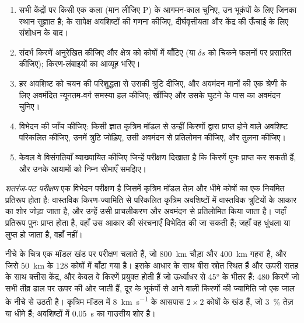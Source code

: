 \begin{method}[एक यात्रा-काल टोमोग्राफ़ी]\label{met:b3:seismology-imaging:tomo}
\begin{enumerate}
  \item सभी केंद्रों पर किसी एक कला (मान लीजिए P) के आगमन-काल चुनिए, उन भूकंपों के
        लिए जिनका स्थान सुज्ञात है;
         के सापेक्ष अवशिष्टों की गणना कीजिए,
        दीर्घवृत्तीयता और केंद्र की ऊँचाई के लिए संशोधन के बाद।
  \item संदर्भ किरणें अनुरेखित कीजिए और क्षेत्र को कोषों में बाँटिए (या $\delta s$ को
        चिकने फलनों पर प्रसारित कीजिए); किरण-लंबाइयों का आव्यूह भरिए।
  \item हर अवशिष्ट को चयन की परिशुद्धता से उसकी त्रुटि दीजिए, और अवमंदन मानों की एक
        श्रेणी के लिए अवमंदित न्यूनतम-वर्ग समस्या हल कीजिए;  खींचिए और
        उसके घुटने के पास का अवमंदन चुनिए।
  \item विभेदन की जाँच कीजिए: किसी ज्ञात कृत्रिम मॉडल से उन्हीं किरणों द्वारा प्राप्त
        होने वाले अवशिष्ट परिकलित कीजिए, उनमें त्रुटि जोड़िए, उसी अवमंदन से प्रतिलोमन
        कीजिए, और तुलना कीजिए।
  \item केवल वे विसंगतियाँ व्याख्यायित कीजिए जिन्हें परीक्षण दिखाता है कि किरणें
        पुनः प्राप्त कर सकती हैं, और उनके आयामों को निम्न सीमाएँ समझिए।
\end{enumerate}
\end{method}

\begin{definition}[शतरंज-पट परीक्षण]\label{def:b3:seismology-imaging:checkerboard}
\emph{शतरंज-पट परीक्षण} एक विभेदन परीक्षण है जिसमें कृत्रिम
मॉडल तेज़ और धीमे कोषों का एक नियमित प्रतिरूप होता है: वास्तविक किरण-ज्यामिति से
परिकलित कृत्रिम अवशिष्टों में वास्तविक त्रुटियों के आकार का शोर जोड़ा जाता है, और
उन्हें उसी प्राचलीकरण और अवमंदन से प्रतिलोमित किया जाता है।
जहाँ प्रतिरूप पुनः प्राप्त होता है, वहाँ उस आकार की संरचनाएँ विभेदित की जा सकती हैं;
जहाँ वह धुंधला या लुप्त हो जाता है, वहाँ नहीं।
\end{definition}

नीचे के चित्र एक मॉडल खंड पर परीक्षण चलाते हैं, जो \qty{800}{km} चौड़ा और
\qty{400}{km} गहरा है, और जिसे \qty{50}{km} के 128 कोषों में बाँटा गया है। इसके आधार
के साथ बीस स्रोत स्थित हैं और ऊपरी सतह के साथ बत्तीस केंद्र, और केवल वे किरणें
प्रयुक्त होती हैं जो ऊर्ध्वाधर से \ang{45} के भीतर हैं: 480 किरणें जो सभी
तीव्र ढाल पर ऊपर की ओर जाती हैं, दूर के भूकंपों से आने वाली किरणों की ज्यामिति
जो एक जाल के नीचे से उठती है। कृत्रिम मॉडल में \qty{8}{km.s^{-1}} के आसपास
$2\times2$ कोषों के खंड हैं, जो \qty{3}{\percent} तेज़ या धीमे हैं; अवशिष्टों में
\qty{0.05}{s} का गाउसीय शोर है।

